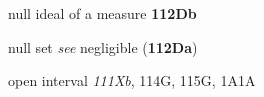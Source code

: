 



































null ideal of a measure {\bf 112Db}




null set {\it see} negligible ({\bf 112Da})


\indexmedskip
























open interval {\it 111Xb}, 114G, 115G, 1A1A



